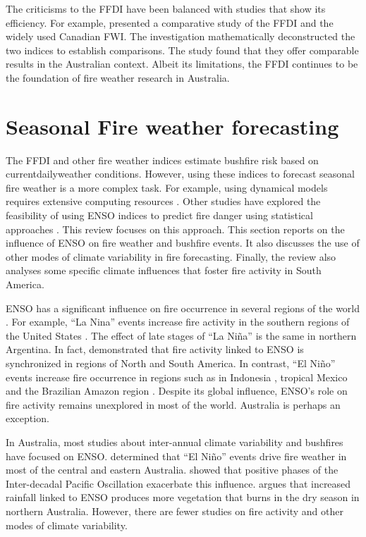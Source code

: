 The criticisms to the FFDI have been balanced with studies that show
its efficiency. For example, \citet{Dowdy2009} presented a comparative
study of the FFDI and the widely used Canadian FWI. The investigation mathematically
deconstructed the two indices to establish comparisons. The study
found that they offer comparable results in the Australian context.
Albeit its limitations, the FFDI continues to be the foundation
of fire weather research in Australia. 


\section{Seasonal Fire weather forecasting }

The FFDI and other fire weather indices estimate bushfire risk based
on current\textemdash daily\textemdash weather conditions. However,
using these indices to forecast seasonal fire weather is a more complex
task. For example, using dynamical models requires extensive computing
resources \citep{Roads2005}. Other studies have explored the feasibility
of using ENSO indices to predict fire danger using statistical approaches
\citep{Kitzberger2002,Nicholls2007,Harris2013}. This review focuses
on this approach. This section reports on the influence of ENSO on
fire weather and bushfire events. It also discusses the use of other
modes of climate variability in fire forecasting. Finally, the review
also analyses some specific climate influences that foster fire activity
in South America. 

ENSO has a significant influence on fire occurrence in several regions
of the world \citep{Carmona-Moreno2005}. For example, \textquotedblleft La
Nina\textquotedblright{} events increase fire activity in the southern
regions of the United States \citep{Swetnam1990,Beckage2003}. The
effect of late stages of ``La Ni\~na'' is the same in northern Argentina.
In fact, \citet{Kitzberger2001} demonstrated that fire activity linked
to ENSO is synchronized in regions of North and South America. In
contrast, \textquotedblleft El Ni\~no\textquotedblright{} events increase
fire occurrence in regions such as in Indonesia \citep{Wooster2012},
tropical Mexico \citep{Roman-Cuesta2003} and the Brazilian Amazon
region \citep{Barlow2004}. Despite its global influence, ENSO's role
on fire activity remains unexplored in most of the world. Australia
is perhaps an exception. 

In Australia, most studies about inter-annual climate variability
and bushfires have focused on ENSO. \citet{Williams1999} determined
that \textquotedblleft El Ni\~no\textquotedblright{} events drive fire
weather in most of the central and eastern Australia. \citet{Verdon2004}
showed that positive phases of the Inter-decadal Pacific Oscillation
exacerbate this influence. \citet{Harris2008} argues that increased
rainfall linked to ENSO produces more vegetation that burns in the
dry season in northern Australia. However, there are fewer studies
on fire activity and other modes of climate variability. 

